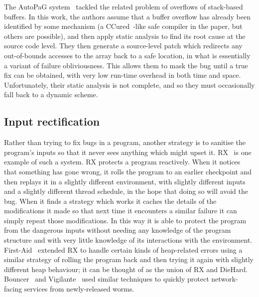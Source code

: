 The AutoPaG system~\cite{Lin2007} tackled the related problem of
overflows of stack-based buffers.  In this work, the authors assume
that a buffer overflow has already been identified by some mechanism
(a CCured~\cite{Necula2005}-like safe compiler in the paper, but
others are possible), and then apply static analysis to find its root
cause at the source code level.  They then generate a source-level
patch which redirects any out-of-bounds accesses to the array back to
a safe location, in what is essentially a variant of failure
obliviousness.  This allows them to mask the bug until a true fix can
be obtained, with very low run-time overhead in both time and space.
Unfortunately, their static analysis is not complete, and so they must
occasionally fall back to a dynamic scheme.

\subsection{Input rectification}

Rather than trying to fix bugs in a program, another strategy is to
sanitise the program's inputs so that it never sees anything which
might upset it.  RX~\cite{Qin2007} is one example of such a system.
RX protects a program reactively.  When it notices that something has
gone wrong, it rolls the program to an earlier checkpoint and then
replays it in a slightly different environment, with slightly
different inputs and a slightly different thread schedule, in the hope
that doing so will avoid the bug.  When it finds a strategy which
works it caches the details of the modifications it made so that next
time it encounters a similar failure it can simply repeat those
modifications.  In this way it is able to protect the program from the
dangerous inputs without needing any knowledge of the program
structure and with very little knowledge of its interactions with the
environment.  First-Aid~\cite{Gao2009} extended RX to handle certain
kinds of heap-related errors using a similar strategy of rolling the
program back and then trying it again with slightly different heap
behaviour; it can be thought of as the union of RX and DieHard.
Bouncer~\cite{Costa2007} and Vigilante~\cite{Costa2008} used similar
techniques to quickly protect network-facing services from
newly-released worms.

